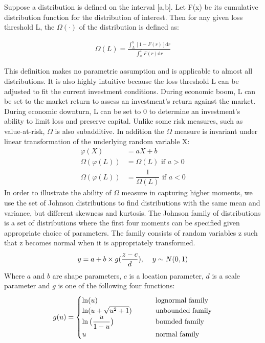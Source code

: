 \documentclass[paper=a4, fontsize=11pt]{scrartcl}
\begin{document}
Suppose a distribution is defined on the interval [a,b]. Let F(x) be its cumulative distribution function for the
distribution of interest. Then for any given loss threshold L, the $\Omega(\cdot)$ of the distribution is defined as:

\begin{align}
\Omega(L) = \frac{\int_L^b[1-F(r)]\mathrm{d}r}{\int_a^L F(r)\mathrm{d} r}
\end{align}

This definition makes no parametric assumption and is applicable to almost all distributions. It is also highly
intuitive because the loss threshold L can be adjusted to fit the current investment conditions. During economic
boom, L can be set to the market return to assess an investment's return against the market. During economic
downturn, L can be set to 0 to determine an investment's ability to limit loss and preserve capital.
Unlike some risk measures, such as value-at-risk,  $\Omega$ is also subadditive. In addition the $\Omega$ measure
is invariant under linear transformation of the underlying random variable X:
\begin{align}
\varphi(X) 			&= aX + b \nonumber \\
\Omega(\varphi(L)) 	&= \Omega(L) \text{ if } a > 0 \nonumber \\
\Omega(\varphi(L)) 	&= \dfrac{1}{\Omega(L)} \text{ if } a < 0
\end{align}
In order to illustrate the ability of $\Omega$ measure in capturing higher moments, we use the set of Johnson
distributions to find distributions with the same mean and variance, but different skewness and kurtosis.
The Johnson family of distributions is a set of distributions where the first four moments can be specified
given appropriate choice of parameters. The family consists of random variables z such that z becomes normal
when it is appropriately transformed.
\begin{align}
y = a + b \times g(\dfrac{z-c}{d}), \hspace{4mm} y \sim N(0,1)
\label{eq:distribution}
\end{align} 
Where $a$ and $b$ are shape parameters, $c$ is a location parameter, $d$ is a scale parameter and $g$ is one of the following four functions:
\begin{align}
g(u) = 
\begin{cases}
\ln(u) \hspace{25mm} &\text{lognormal family}\\
\ln(u + \sqrt{u^2+1}) &\text{unbounded family}\\
\ln\big(\dfrac{u}{1-u}\big) &\text{bounded family}\\
u &\text{normal family}
\end{cases}
\label{eq:Cases}
\end{align}
\end{document}
